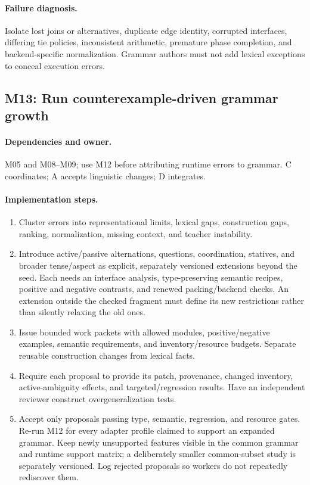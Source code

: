\documentclass[11pt,a4paper]{article}
\begin{document}
\paragraph{Failure diagnosis.} Isolate lost joins or alternatives, duplicate
edge identity, corrupted interfaces, differing tie policies, inconsistent
arithmetic, premature phase completion, and backend-specific normalization.
Grammar authors must not add lexical exceptions to conceal execution errors.

\subsection{M13: Run counterexample-driven grammar growth}

\paragraph{Dependencies and owner.} M05 and M08--M09; use M12 before attributing runtime errors to grammar. C coordinates; A accepts linguistic changes; D integrates.

\paragraph{Implementation steps.}
\begin{enumerate}
\item Cluster errors into representational limits, lexical gaps, construction gaps, ranking, normalization, missing context, and teacher instability.
\item Introduce active/passive alternations, questions, coordination, statives, and broader tense/aspect as explicit, separately versioned extensions beyond the seed. Each needs an interface analysis, type-preserving semantic recipes, positive and negative contrasts, and renewed packing/backend checks. An extension outside the checked fragment must define its new restrictions rather than silently relaxing the old ones.
\item Issue bounded work packets with allowed modules, positive/negative examples, semantic requirements, and inventory/resource budgets. Separate reusable construction changes from lexical facts.
\item Require each proposal to provide its patch, provenance, changed inventory, active-ambiguity effects, and targeted/regression results. Have an independent reviewer construct overgeneralization tests.
\item Accept only proposals passing type, semantic, regression, and resource gates. Re-run M12 for every adapter profile claimed to support an expanded grammar. Keep newly unsupported features visible in the common grammar and runtime support matrix; a deliberately smaller common-subset study is separately versioned. Log rejected proposals so workers do not repeatedly rediscover them.
\end{enumerate}
\end{document}
